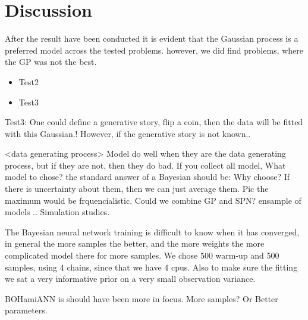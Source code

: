 \chapter{Discussion}
After the result have been conducted it is evident that the Gaussian process is a preferred model
across the tested problems. however, we did find problems, where the GP was not the best. 
\begin{itemize}
    \item Test2
    \item Test3
\end{itemize}




Test3: One could define a generative story, flip a coin, then the data will
be fitted with this Gaussian.! However, if the generative story is not known..


<data generating process>
Model do well when they are the data generating process, but if they are not, then
they do bad. If you collect all model, 
What model to chose? the standard answer of a Bayesian should be: Why choose? If there 
is uncertainty about them, then we can just average them. Pic the maximum would be frquencialistic.
Could we combine GP and SPN?
ensample of models ..
Simulation studies. 


The Bayesian neural network training is difficult to know when it has converged, in general the more samples the better, 
and the more weights the more complicated model there for more samples. We chose 500 warm-up and 500 samples, using 4
chains, since that we have 4 cpus. Also to make sure the fitting we sat a very informative prior on a very small observation
variance. 

BOHamiANN is should have been more in focus. More samples? Or Better parameters. 

